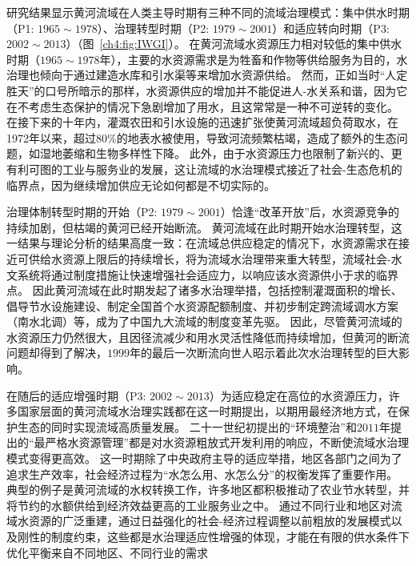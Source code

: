
研究结果显示黄河流域在人类主导时期有三种不同的流域治理模式：集中供水时期（P1: $1965 \sim 1978$）、治理转型时期（P2: $1979 \sim 2001$）和适应转向时期（P3: $2002 \sim 2013$）（图~\ref{ch4:fig:IWGI}）。
在黄河流域水资源压力相对较低的集中供水时期（$1965 \sim 1978$年），主要的水资源需求是为牲畜和作物等供给服务为目的，水治理也倾向于通过建造水库和引水渠等来增加水资源供给。
然而，正如当时“人定胜天”的口号所暗示的那样，水资源供应的增加并不能促进人-水关系和谐，因为它在不考虑生态保护的情况下急剧增加了用水，且这常常是一种不可逆转的变化\cite{zhou2020}。
在接下来的十年内，灌溉农田和引水设施的迅速扩张使黄河流域超负荷取水，在1972年以来，超过$80\%$的地表水被使用，导致河流频繁枯竭，造成了额外的生态问题，如湿地萎缩和生物多样性下降\cite{wang2019c}。
此外，由于水资源压力也限制了新兴的、更有利可图的工业与服务业的发展，这让流域的水治理模式接近了社会-生态危机的临界点，因为继续增加供应无论如何都是不切实际的\cite{loch2020, wohlfart2016a}。

治理体制转型时期的开始（P2: $1979 \sim 2001$）恰逢“改革开放”后，水资源竞争的持续加剧，但枯竭的黄河已经开始断流。
黄河流域在此时期开始水治理转型，这一结果与理论分析的结果高度一致：在流域总供应稳定的情况下，水资源需求在接近可供给水资源上限后的持续增长，将为流域水治理带来重大转型，流域社会-水文系统将通过制度措施让快速增强社会适应力，以响应该水资源供小于求的临界点\cite{loch2020}。
因此黄河流域在此时期发起了诸多水治理举措，包括控制灌溉面积的增长、倡导节水设施建设、制定全国首个水资源配额制度、并初步制定跨流域调水方案（南水北调）等\cite{wang2019b,long2020,nickum2021}，成为了中国九大流域的制度变革先驱。
因此，尽管黄河流域的水资源压力仍然很大，且因径流减少和用水灵活性降低而持续增加，但黄河的断流问题却得到了解决，$1999$年的最后一次断流向世人昭示着此次水治理转型的巨大影响\cite{wang2019b}。

在随后的适应增强时期（P3: $2002 \sim 2013$）为适应稳定在高位的水资源压力，许多国家层面的黄河流域水治理实践都在这一时期提出，以期用最经济地方式，在保护生态的同时实现流域高质量发展。
二十一世纪初提出的“环境整治”和$2011$年提出的“最严格水资源管理”都是对水资源粗放式开发利用的响应，不断使流域水治理模式变得更高效。
这一时期除了中央政府主导的适应举措，地区各部门之间为了追求生产效率，社会经济过程为“水怎么用、水怎么分”的权衡发挥了重要作用。
典型的例子是黄河流域的水权转换工作，许多地区都积极推动了农业节水转型，并将节约的水额供给到经济效益更高的工业服务业之中。
通过不同行业和地区对流域水资源的广泛重建，通过日益强化的社会-经济过程调整以前粗放的发展模式以及刚性的制度约束，这些都是水治理适应性增强的体现，才能在有限的供水条件下优化平衡来自不同地区、不同行业的需求\cite{dalin2015,song2022}


